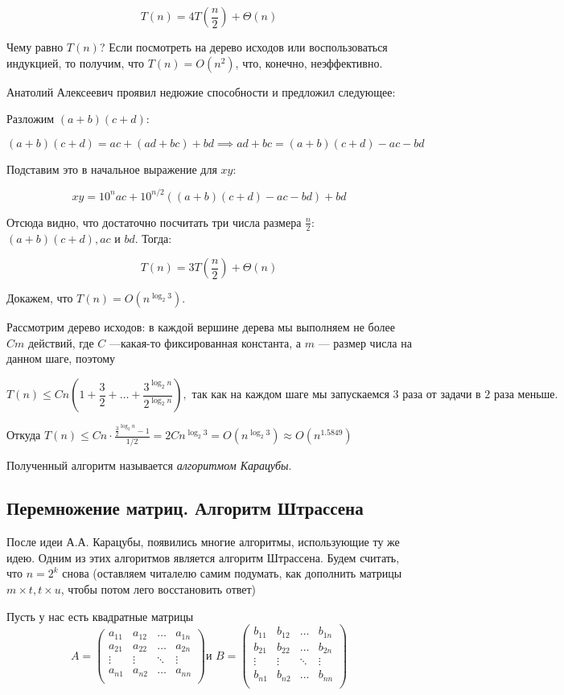\documentclass[a4paper, 12pt]{article}
\begin{document}
\[T(n) = 4T\left( \frac{n}{2} \right) + \Theta(n)\]

Чему равно $T(n)$? Если посмотреть на дерево исходов или воспользоваться 
индукцией, то получим, что $T(n) = O(n^2)$, что, конечно,
неэффективно.

Анатолий Алексеевич проявил недюжие способности и предложил
следующее:

Разложим $(a + b)(c + d)$:

\[(a+b)(c+d) = ac+(ad+bc) + bd \implies ad + bc = (a + b)(c + d) - ac - bd\]

Подставим это в начальное выражение для $xy$:

\[xy = 10^{n}ac + 10^{n/2}((a + b)(c + d) - ac - bd)+bd\]

Отсюда видно, что достаточно посчитать три числа размера $\frac{n}{2}$: $(a + b)(c + d), ac$ и $bd$. Тогда:

\[T(n) = 3T\left( \frac{n}{2} \right) + \Theta(n)\]

Докажем, что $T(n) = O(n^{\log_2 3})$.

Рассмотрим дерево исходов: в каждой вершине дерева мы выполняем не более
$Cm$ действий, где $C$ ---какая-то фиксированная константа, а $m$ --- размер числа на данном шаге, поэтому 

\[
  T(n) \leqslant Cn\left(1 + \frac{3}{2} + \ldots + \frac{3^{\log_2 n}}{2^{
  \log_2 n}}\right), \text{ так как
  на каждом шаге мы запускаемся 3 раза от задачи в 2 раза меньше.}
\]

Откуда $T(n) \leqslant Cn \cdot \frac{\frac{3}{2}^{\log_2 n} - 1}{1/2} = 
2Cn^{\log_2 3} = O(n^{\log_2 3}) \approx O(n^{1.5849})$

Полученный алгоритм называется \emph{алгоритмом Карацубы}.

\subsection{Перемножение матриц. Алгоритм Штрассена}

После идеи А.А. Карацубы, появились многие алгоритмы, использующие ту же идею.
Одним из этих алгоритмов является алгоритм Штрассена. Будем считать, что $n = 
2^k$ снова (оставляем читалелю самим подумать, как дополнить матрицы $m \times t,
t \times u$, чтобы потом лего восстановить ответ)

Пусть у нас есть квадратные матрицы
\[A = \begin{pmatrix}
a_{11} & a_{12} & \ldots & a_{1n} \\
a_{21} & a_{22} & \ldots & a_{2n} \\
\vdots & \vdots & \ddots & \vdots \\
a_{n1} & a_{n2} & \ldots & a_{nn} \\
\end{pmatrix}
\text{и } 
B = \begin{pmatrix}
b_{11} & b_{12} & \ldots & b_{1n} \\
b_{21} & b_{22} & \ldots & b_{2n} \\
\vdots & \vdots & \ddots & \vdots \\
b_{n1} & b_{n2} & \ldots & b_{nn} \\
\end{pmatrix}\]
\end{document}
